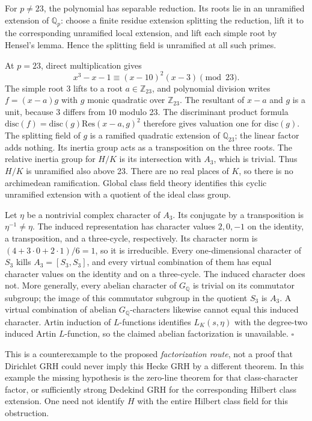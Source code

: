 \documentclass[11pt,a4paper]{article}
\theoremstyle{definition}\newtheorem{definition}[theorem]{Definition}
\theoremstyle{remark}\newtheorem{remark}[theorem]{Remark}
\begin{document}
For \(p\ne23\), the polynomial has separable reduction. Its roots lie in
an unramified extension of \(\mathbb Q_p\): choose a finite residue
extension splitting the reduction, lift it to the corresponding
unramified local extension, and lift each simple root by Hensel's lemma.
Hence the splitting field is unramified at all such primes.

At \(p=23\), direct multiplication gives \[
 x^3-x-1\equiv(x-10)^2(x-3)\pmod{23}.
\] The simple root \(3\) lifts to a root \(a\in\mathbb Z_{23}\), and
polynomial division writes \(f=(x-a)g\) with \(g\) monic quadratic over
\(\mathbb Z_{23}\). The resultant of \(x-a\) and \(g\) is a unit,
because \(3\) differs from \(10\) modulo 23. The discriminant product
formula \(\mathrm{disc}(f)=\mathrm{disc}(g)\mathrm{Res}(x-a,g)^2\)
therefore gives valuation one for \(\mathrm{disc}(g)\). The splitting
field of \(g\) is a ramified quadratic extension of \(\mathbb Q_{23}\);
the linear factor adds nothing. Its inertia group acts as a
transposition on the three roots. The relative inertia group for \(H/K\)
is its intersection with \(A_3\), which is trivial. Thus \(H/K\) is
unramified also above 23. There are no real places of \(K\), so there is
no archimedean ramification. Global class field theory identifies this
cyclic unramified extension with a quotient of the ideal class group.

Let \(\eta\) be a nontrivial complex character of \(A_3\). Its conjugate
by a transposition is \(\eta^{-1}\ne\eta\). The induced representation
has character values \(2,0,-1\) on the identity, a transposition, and a
three-cycle, respectively. Its character norm is
\((4+3\cdot0+2\cdot1)/6=1\), so it is irreducible. Every one-dimensional
character of \(S_3\) kills \(A_3=[S_3,S_3]\), and every virtual
combination of them has equal character values on the identity and on a
three-cycle. The induced character does not. More generally, every
abelian character of \(G_\mathbb Q\) is trivial on its commutator
subgroup; the image of this commutator subgroup in the quotient \(S_3\)
is \(A_3\). A virtual combination of abelian \(G_\mathbb Q\)-characters
likewise cannot equal this induced character. Artin induction of
\(L\)-functions identifies \(L_K(s,\eta)\) with the degree-two induced
Artin \(L\)-function, so the claimed abelian factorization is
unavailable. \(\square\)

This is a counterexample to the proposed \emph{factorization route}, not
a proof that Dirichlet GRH could never imply this Hecke GRH by a
different theorem. In this example the missing hypothesis is the
zero-line theorem for that class-character factor, or sufficiently
strong Dedekind GRH for the corresponding Hilbert class extension. One
need not identify \(H\) with the entire Hilbert class field for this
obstruction.
\end{document}
